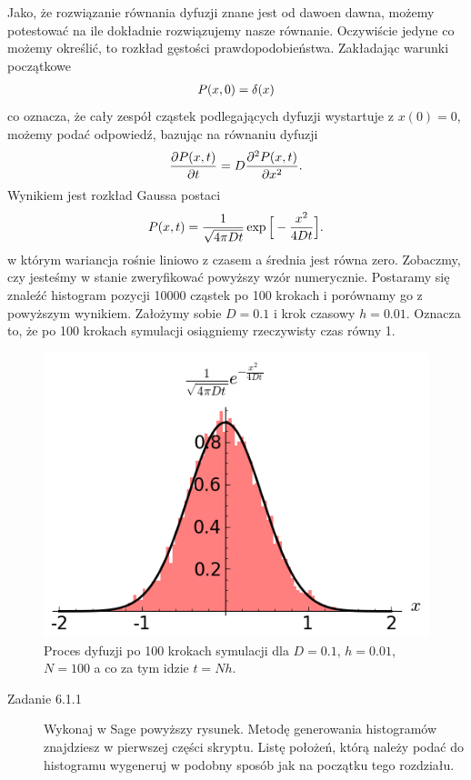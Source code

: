 \documentclass[a4paper,12pt,polish]{sphinxmanual}
\begin{document}
Jako, że rozwiązanie równania dyfuzji znane jest od dawoen dawna, możemy potestować
na ile dokładnie rozwiązujemy nasze równanie. Oczywiście jedyne co możemy określić,
to rozkład gęstości prawdopodobieństwa. Zakładając warunki początkowe
\begin{gather}
\begin{split}P(x,0) = \delta (x)\end{split}\notag
\end{gather}
co oznacza, że cały zespół cząstek podlegających dyfuzji wystartuje z $x(0)=0$,
możemy podać odpowiedź, bazując na równaniu dyfuzji
\begin{gather}
\begin{split}\frac{\partial P(x,t)}{\partial t} = D\frac{\partial^2 P(x,t)}{\partial x^2}.\end{split}\notag
\end{gather}
Wynikiem jest rozkład Gaussa postaci
\begin{gather}
\begin{split}P(x,t) = \frac{1}{\sqrt{4 \pi D t}} \exp \Big[ -\frac{x^2}{4 D t} \Big].\end{split}\notag
\end{gather}
w którym wariancja rośnie liniowo z czasem a średnia jest równa zero. Zobaczmy, czy jesteśmy w
stanie zweryfikować powyższy wzór numerycznie. Postaramy się znaleźć histogram
pozycji 10000 cząstek po 100 krokach i porównamy go z powyższym wynikiem. Założymy sobie
$D=0.1$ i krok czasowy $h=0.01$. Oznacza to, że po 100 krokach symulacji
osiągniemy rzeczywisty czas równy 1.
\begin{figure}[htbp]
\centering
\capstart

\includegraphics{dyf_100n.png}
\caption{Proces dyfuzji po 100 krokach symulacji dla $D=0.1$, $h=0.01$, $N=100$
a co za tym idzie $t=Nh$.}\end{figure}
\begin{description}
\item[{Zadanie 6.1.1}] \leavevmode
Wykonaj w Sage powyższy rysunek. Metodę generowania histogramów znajdziesz w pierwszej
części skryptu. Listę położeń, którą należy podać do histogramu wygeneruj w podobny
sposób jak na początku tego rozdziału.

\end{description}
\end{document}
